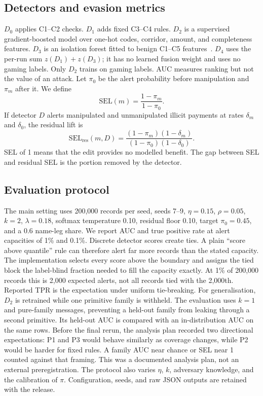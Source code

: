 \documentclass[conference]{IEEEtran}
\begin{document}
\subsection{Detectors and evasion metrics}
$D_0$ applies C1--C2 checks. $D_1$ adds fixed C3--C4 rules. $D_2$ is a
supervised gradient-boosted model over one-hot codes, corridor, amount, and
completeness features. $D_3$ is an isolation forest fitted to benign C1--C5
features~\cite{liu2008}. $D_4$ uses the per-run sum
$z(D_1)+z(D_3)$; it has no learned fusion weight and uses no gaming labels.
Only $D_2$ trains on gaming labels.
AUC measures ranking but not the value of an attack. Let $\pi_0$ be the alert
probability before manipulation and $\pi_m$ after it. We define
\begin{equation}
 \mathrm{SEL}(m)=\frac{1-\pi_m}{1-\pi_0}.
 \label{eq:sel}
\end{equation}
If detector $D$ alerts manipulated and unmanipulated illicit payments at rates
$\delta_m$ and $\delta_0$, the residual lift is
\begin{equation}
 \mathrm{SEL}_{\mathrm{res}}(m,D)=
 \frac{(1-\pi_m)(1-\delta_m)}{(1-\pi_0)(1-\delta_0)}.
 \label{eq:selres}
\end{equation}
SEL of 1 means that the edit provides no modelled benefit. The gap between
SEL and residual SEL is the portion removed by the detector.
\subsection{Evaluation protocol}
The main setting uses 200,000 records per seed, seeds 7--9, $\eta=0.15$,
$\rho=0.05$, $k=2$, $\lambda=0.18$, softmax temperature 0.10, residual floor
0.10, target $\pi_0=0.45$, and a 0.6 name-leg share. We report AUC and true
positive rate at alert capacities of 1\% and 0.1\%.
Discrete detector scores create ties. A plain ``score above quantile'' rule can
therefore alert far more records than the stated capacity. The implementation
selects every score above the boundary and assigns the tied block the
label-blind fraction needed to fill the capacity exactly. At 1\% of 200,000
records this is 2,000 expected alerts, not all records tied with the 2,000th.
Reported TPR is the expectation under uniform tie-breaking.
For generalisation, $D_2$ is retrained while one primitive family is withheld.
The evaluation uses $k=1$ and pure-family messages, preventing a held-out
family from leaking through a second primitive. Its held-out AUC is compared
with an in-distribution AUC on the same rows. Before the final rerun, the
analysis plan recorded two directional expectations: P1 and P3 would behave
similarly as coverage changes, while P2 would be harder for fixed rules. A
family AUC near chance or SEL near 1 counted against that framing. This was a
documented analysis plan, not an external preregistration. The protocol also
varies $\eta$, $k$, adversary knowledge, and the calibration of $\pi$.
Configuration, seeds, and raw JSON outputs are retained with the release.
\end{document}
